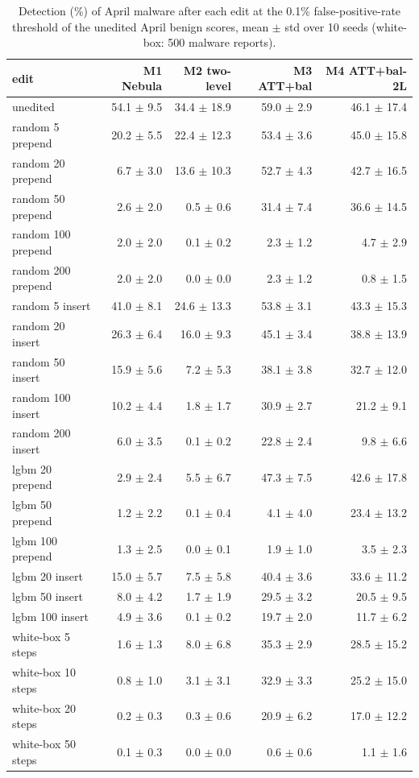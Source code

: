\begin{table}[t]
\centering
\small
\caption{Detection (\%) of April malware after each edit at the 0.1\% false-positive-rate threshold of the unedited April benign scores, mean $\pm$ std over 10 seeds (white-box: 500 malware reports).}
\label{tab:T5b_attack_detection_0.1pct}
\begin{tabular}{lrrrr}
\toprule
edit & M1 Nebula & M2 two-level & M3 ATT+bal & M4 ATT+bal-2L \\
\midrule
unedited & 54.1 $\pm$ 9.5 & 34.4 $\pm$ 18.9 & 59.0 $\pm$ 2.9 & 46.1 $\pm$ 17.4 \\
random 5 prepend & 20.2 $\pm$ 5.5 & 22.4 $\pm$ 12.3 & 53.4 $\pm$ 3.6 & 45.0 $\pm$ 15.8 \\
random 20 prepend & 6.7 $\pm$ 3.0 & 13.6 $\pm$ 10.3 & 52.7 $\pm$ 4.3 & 42.7 $\pm$ 16.5 \\
random 50 prepend & 2.6 $\pm$ 2.0 & 0.5 $\pm$ 0.6 & 31.4 $\pm$ 7.4 & 36.6 $\pm$ 14.5 \\
random 100 prepend & 2.0 $\pm$ 2.0 & 0.1 $\pm$ 0.2 & 2.3 $\pm$ 1.2 & 4.7 $\pm$ 2.9 \\
random 200 prepend & 2.0 $\pm$ 2.0 & 0.0 $\pm$ 0.0 & 2.3 $\pm$ 1.2 & 0.8 $\pm$ 1.5 \\
random 5 insert & 41.0 $\pm$ 8.1 & 24.6 $\pm$ 13.3 & 53.8 $\pm$ 3.1 & 43.3 $\pm$ 15.3 \\
random 20 insert & 26.3 $\pm$ 6.4 & 16.0 $\pm$ 9.3 & 45.1 $\pm$ 3.4 & 38.8 $\pm$ 13.9 \\
random 50 insert & 15.9 $\pm$ 5.6 & 7.2 $\pm$ 5.3 & 38.1 $\pm$ 3.8 & 32.7 $\pm$ 12.0 \\
random 100 insert & 10.2 $\pm$ 4.4 & 1.8 $\pm$ 1.7 & 30.9 $\pm$ 2.7 & 21.2 $\pm$ 9.1 \\
random 200 insert & 6.0 $\pm$ 3.5 & 0.1 $\pm$ 0.2 & 22.8 $\pm$ 2.4 & 9.8 $\pm$ 6.6 \\
lgbm 20 prepend & 2.9 $\pm$ 2.4 & 5.5 $\pm$ 6.7 & 47.3 $\pm$ 7.5 & 42.6 $\pm$ 17.8 \\
lgbm 50 prepend & 1.2 $\pm$ 2.2 & 0.1 $\pm$ 0.4 & 4.1 $\pm$ 4.0 & 23.4 $\pm$ 13.2 \\
lgbm 100 prepend & 1.3 $\pm$ 2.5 & 0.0 $\pm$ 0.1 & 1.9 $\pm$ 1.0 & 3.5 $\pm$ 2.3 \\
lgbm 20 insert & 15.0 $\pm$ 5.7 & 7.5 $\pm$ 5.8 & 40.4 $\pm$ 3.6 & 33.6 $\pm$ 11.2 \\
lgbm 50 insert & 8.0 $\pm$ 4.2 & 1.7 $\pm$ 1.9 & 29.5 $\pm$ 3.2 & 20.5 $\pm$ 9.5 \\
lgbm 100 insert & 4.9 $\pm$ 3.6 & 0.1 $\pm$ 0.2 & 19.7 $\pm$ 2.0 & 11.7 $\pm$ 6.2 \\
white-box 5 steps & 1.6 $\pm$ 1.3 & 8.0 $\pm$ 6.8 & 35.3 $\pm$ 2.9 & 28.5 $\pm$ 15.2 \\
white-box 10 steps & 0.8 $\pm$ 1.0 & 3.1 $\pm$ 3.1 & 32.9 $\pm$ 3.3 & 25.2 $\pm$ 15.0 \\
white-box 20 steps & 0.2 $\pm$ 0.3 & 0.3 $\pm$ 0.6 & 20.9 $\pm$ 6.2 & 17.0 $\pm$ 12.2 \\
white-box 50 steps & 0.1 $\pm$ 0.3 & 0.0 $\pm$ 0.0 & 0.6 $\pm$ 0.6 & 1.1 $\pm$ 1.6 \\
\bottomrule
\end{tabular}
\end{table}
